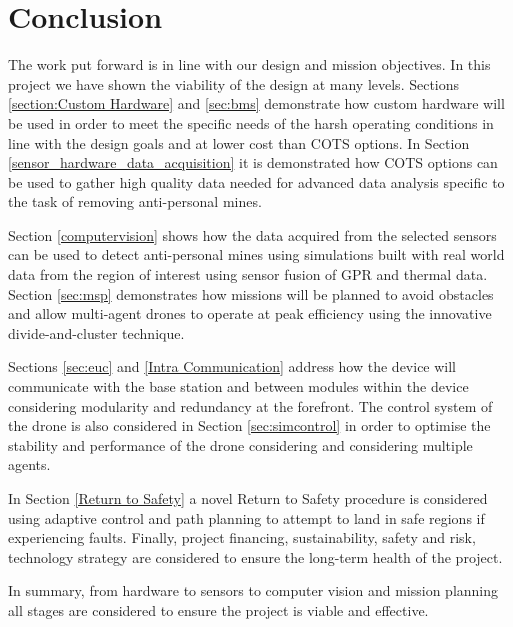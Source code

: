 \newpage
{}

\section{Conclusion} \label{conclusion}

The work put forward is in line with our design and mission objectives. In this project we have shown the viability of the design at many levels. Sections \ref{section:Custom Hardware} and \ref{sec:bms} demonstrate how custom hardware will be used in order to meet the specific needs of the harsh operating conditions in line with the design goals and at lower cost than \gls{COTS} options. In Section \ref{sensor_hardware_data_acquisition} it is demonstrated how \gls{COTS} options can be used to gather high quality data needed for advanced data analysis specific to the task of removing anti-personal mines.

Section \ref{computervision} shows how the data acquired from the selected sensors can be used to detect anti-personal mines using simulations built with real world data from the region of interest using sensor fusion of \gls{GPR} and thermal data. Section \ref{sec:msp} demonstrates how missions will be planned to avoid obstacles and allow multi-agent drones to operate at peak efficiency using the innovative divide-and-cluster technique. 

Sections \ref{sec:euc} and \ref{Intra Communication} address how the device will communicate with the base station and between modules within the device considering modularity and redundancy at the forefront. The control system of the drone is also considered in Section \ref{sec:simcontrol} in order to optimise the stability and performance of the drone considering and considering multiple agents. 

In Section \ref{Return to Safety} a novel Return to Safety procedure is considered using adaptive control and path planning to attempt to land in safe regions if experiencing faults. Finally, project financing, sustainability, safety and risk, technology strategy are considered to ensure the long-term health of the project. 

In summary, from hardware to sensors to computer vision and mission planning all stages are considered to ensure the project is viable and effective.